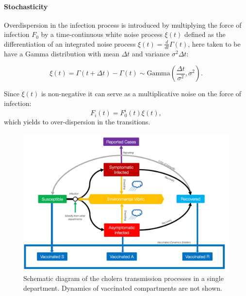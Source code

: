     
\paragraph{Stochasticity} Overdispersion in the infection process is introduced by multiplying the force of infection $F_0$ by a time-continuous white noise process \(\xi(t)\) defined as the differentiation of an integrated noise process \(\xi(t) = \frac{d}{dt}\Gamma(t)\), here taken to be have a Gamma distribution with mean \(\Delta t\) and variance \(\sigma^2 \Delta t\)\cite[-3\baselineskip]{Breto:CompoundMarkovCounting:2011}:

\[
\xi(t) = \Gamma (t+\Delta t) - \Gamma (t) \sim \text{Gamma}\left( \frac{\Delta t}{\sigma^2}, \sigma^2\right).
\]

Since \(\xi(t)\) is non-negative it can serve as a multiplicative noise on
the force of infection: \[
F_i(t) = F^i_0(t) \xi(t),
\]
which yields to over-dispersion in the transitions.

\begin{figure}%
\begin{center}
\includegraphics{fig_cholera-haiti-ocv/compartiments.png}
\caption[Schematic diagram of the cholera transmission processes in a single department]{Schematic diagram of the cholera transmission processes in a single department. Dynamics of vaccinated compartments are not shown.}
\label{figEPFL}
\end{center}
\end{figure}

